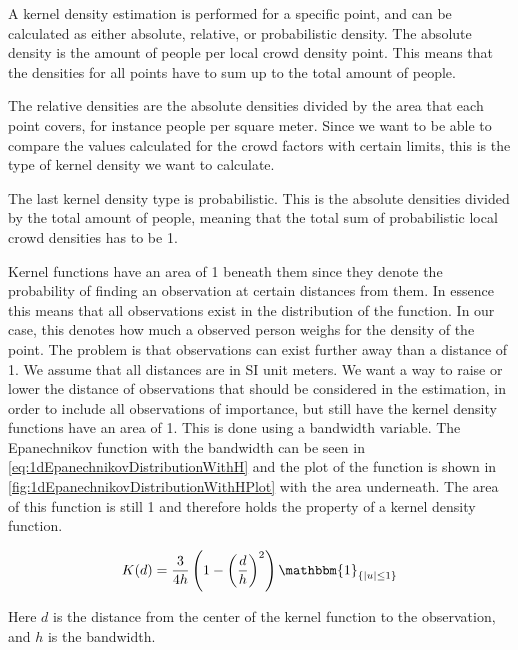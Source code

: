 A kernel density estimation is performed for a specific point, and can be calculated as either absolute, relative, or probabilistic density. The absolute density is the amount of people per local crowd density point. This means that the densities for all points have to sum up to the total amount of people.

The relative densities are the absolute densities divided by the area that each point covers, for instance people per square meter. Since we want to be able to compare the values calculated for the crowd factors with certain limits, this is the type of kernel density we want to calculate.

The last kernel density type is probabilistic. This is the absolute densities divided by the total amount of people, meaning that the total sum of probabilistic local crowd densities has to be 1.

Kernel functions have an area of 1 beneath them since they denote the probability of finding an observation at certain distances from them. In essence this means that all observations exist in the distribution of the function. In our case, this denotes how much a observed person weighs for the density of the point. The problem is that observations can exist further away than a distance of 1. We assume that all distances are in SI unit meters. We want a way to raise or lower the distance of observations that should be considered in the estimation, in order to include all observations of importance, but still have the kernel density functions have an area of 1. This is done using a bandwidth variable. The Epanechnikov function with the bandwidth can be seen in \cref{eq:1dEpanechnikovDistributionWithH} and the plot of the function is shown in \cref{fig:1dEpanechnikovDistributionWithHPlot} with the area underneath. The area of this function is still 1 and therefore holds the property of a kernel density function.

\begin{equation}
\label{eq:1dEpanechnikovDistributionWithH}
K(d) = \frac{3}{4 h} \left( 1-\left(\frac{d}{h}\right)^2 \right) \mathbbm{1}_{\{|u| \leq 1\}}
\end{equation}

Here $d$ is the distance from the center of the kernel function to the observation, and $h$ is the bandwidth.

